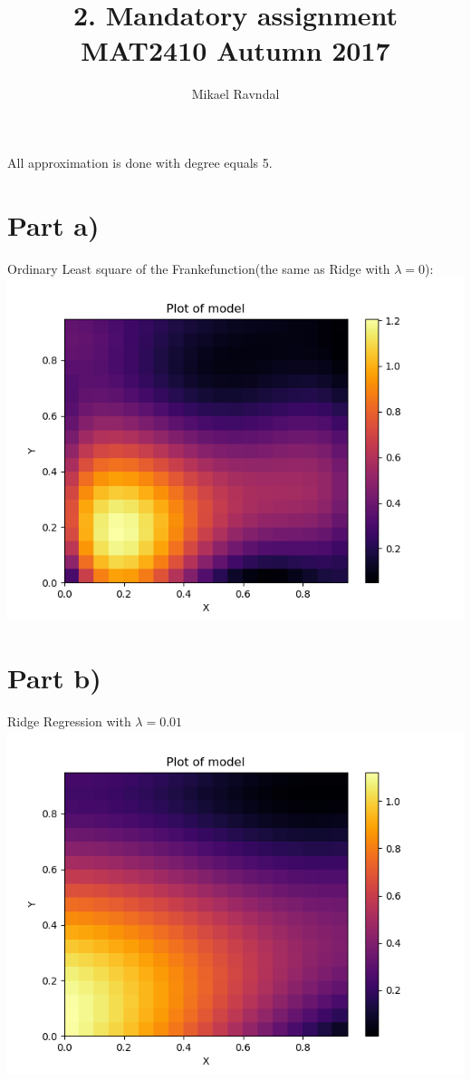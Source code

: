 \documentclass[a4paper,norsk]{article}
\title {2. Mandatory assignment MAT2410 Autumn 2017}
\author {Mikael Ravndal}
\begin{document}
\maketitle
All approximation is done with degree equals 5.
\section*{Part a)}
Ordinary Least square of the Frankefunction(the same as Ridge with $\lambda=0$):
\\ \includegraphics[scale=.7]{partaOLSlambda1}
\clearpage
\section*{Part b)}
Ridge Regression with $\lambda = 0.01$
\\ \includegraphics[scale=.7]{partbRidgeLambda001}
\clearpage
\end{document}
